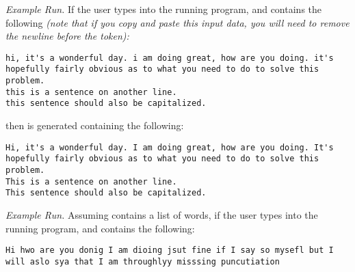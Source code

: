     \textit{Example Run.} If the user types  into the running program, and  contains the following \textit{(note that if you copy and paste this input data, you will need to remove the newline before the  token):}

    \begin{footnotesize}
\begin{verbatim}
hi, it's a wonderful day. i am doing great, how are you doing. it's 
hopefully fairly obvious as to what you need to do to solve this problem.
this is a sentence on another line.
this sentence should also be capitalized.
    \end{verbatim}
\end{footnotesize}

    then  is generated containing the following:

    \begin{footnotesize}
\begin{verbatim}
Hi, it's a wonderful day. I am doing great, how are you doing. It's 
hopefully fairly obvious as to what you need to do to solve this problem.
This is a sentence on another line.
This sentence should also be capitalized.
    \end{verbatim}
\end{footnotesize}


    \textit{Example Run.} Assuming  contains a list of words, if the user types  into the running program, and  contains the following:

    \begin{footnotesize}
\begin{verbatim}
Hi hwo are you donig I am dioing jsut fine if I say so mysefl but I 
will aslo sya that I am throughlyy misssing puncutiation
    \end{verbatim}
\end{footnotesize}

